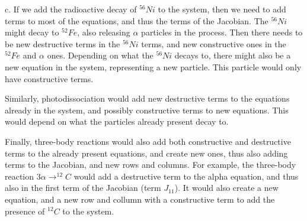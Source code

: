 \documentclass[a4paper,12pt]{article}
\begin{document}
\noindent c. If we add the radioactive decay of $^{56}Ni$ to the system, then we need to add terms to most of the equations, and thus the terms of the Jacobian. The $^{56}Ni$ might decay to $^{52}Fe$, also releasing $\alpha$ particles in the process. Then there needs to be new destructive terms in the $^{56}Ni$ terms, and new constructive ones in the $^{52}Fe$ and $\alpha$ ones. Depending on what the $^{56}Ni$ decays to, there might also be a new equation in the system, representing a new particle. This particle would only have constructive terms.

Similarly, photodissociation would add new destructive terms to the equations already in the system, and possibly constructive terms to new equations. This would depend on what the particles already present decay to.

Finally, three-body reactions would also add both constructive and destructive terms to the already present equations, and create new ones, thus also adding terms to the Jacobian, and new rows and columns. For example, the three-body reaction $3\alpha \rightarrow ^{12}C$ would add a destructive term to the alpha equation, and thus also in the first term of the Jacobian (term $J_{11}$). It would also create a new equation, and a new row and collumn with a constructive term to add the presence of $^{12}C$ to the system.
\end{document}
